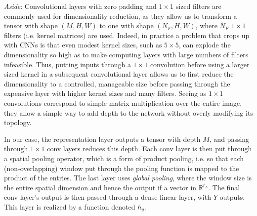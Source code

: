 \documentclass{article}
\begin{document}
\begin{adjustwidth}{0.85cm}{0.85cm}
    \textit{Aside}: Convolutional layers with zero padding and $ 1 \times 1 $ sized filters are commonly used for dimensionality reduction, as they allow us to transform a tensor with shape $ (M, H, W) $ to one with shape $ (N_F, H, W) $, where $ N_F $ $ 1 \times 1 $ filters (i.e. kernel matrices) are used. Indeed, in practice a problem that crops up with CNNs is that even modest kernel sizes, such as $ 5 \times 5 $, can explode the dimensionality so high as to make computing layers with large numbers of filters infeasible. Thus, putting inputs through a $ 1 \times 1 $ convolution before using a larger sized kernel in a subsequent convolutional layer allows us to first reduce the dimensionality to a controlled, manageable size before passing through the expensive layer with higher kernel sizes and many filters. Seeing as $ 1 \times 1 $ convolutions correspond to simple matrix multiplication over the entire image, they allow a simple way to add depth to the network without overly modifying its topology.
\end{adjustwidth}
\leavevmode \newline
In our case, the representation layer outputs a tensor with depth $ M $, and passing through $ 1 \times 1 $ conv layers reduces this depth. Each conv layer is then put through a spatial pooling operator, which is a form of product pooling, i.e. so that each (non-overlapping) window put through the pooling function is mapped to the product of the entries. The last layer uses \textit{global pooling}, where the window size is the entire spatial dimension and hence the output if a vector in $ \mathbb{R}^{r_L} $.
\newline \newline
The final conv layer's output is then passed through a dense linear layer, with $ Y $ outputs. This layer is realized by a function denoted $ h_y $.
\end{document}
